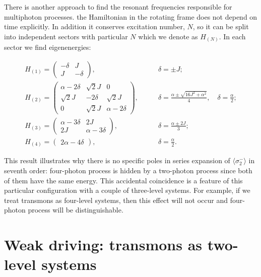 \documentclass[%
 aps, pra,
 amsmath,amssymb,
 preprint,%
superscriptaddress
]{revtex4-2}
\begin{document}
There is another approach to find the resonant frequencies responsible for multiphoton processes. 
the Hamiltonian in the rotating frame does not depend on time explicitly. In addition it conserves excitation number, $N$, so it can be split into independent sectors with particular $N$ which we denote as $H_{(N)}$.
In each sector we find eigenenergies:
\begin{widetext}
	$$
	\begin{array}{ccc}
	H_{(1)} = \begin{pmatrix}
	-\delta & J
	\\
	J & -\delta
	\end{pmatrix},
	\qquad &
	\delta = \pm J;
	\\[1em]
	H_{(2)} = \begin{pmatrix}
	\alpha - 2\delta & \sqrt{2} J & 0
	\\
	\sqrt{2} J & - 2\delta & \sqrt{2} J
	\\
	0 & \sqrt{2} J & \alpha - 2 \delta
	\end{pmatrix},
	\qquad &
	\displaystyle
	\delta = \frac{\alpha \pm \sqrt{16 J^2 + \alpha^2}}{4}, \quad \delta = \frac{\alpha}{2};
	\\[2em]
	H_{(3)} = \begin{pmatrix}
	\alpha - 3\delta & 2J
	\\
	2 J & \alpha - 3 \delta
	\end{pmatrix},
	\qquad & \displaystyle
	\delta = \frac{\alpha \pm 2 J}{3};
	\\[2em]
	H_{(4)} = \begin{pmatrix}
	2 \alpha - 4\delta
	\end{pmatrix},
	\qquad & \displaystyle
	\delta = \frac{\alpha}{2}.
	\end{array}
	$$
\end{widetext}\onecolumngrid
This result illustrates why there is no specific poles in series expansion of $\langle\sigma_{2}^-\rangle$ in seventh order: four-photon process is hidden by a two-photon process since both of them have the same energy. This accidental coincidence is a feature of this particular configuration with a couple of three-level systems. For example, if we treat transmons as  four-level systems, then this effect will not occur and four-photon process will be distinguishable.

\section{Weak driving: transmons as two-level systems}
\end{document}
